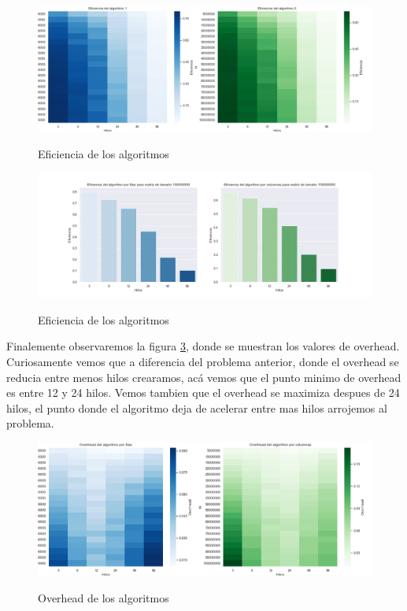 \documentclass{report}
\begin{document}
\begin{figure}[H]
    \centering
  \caption{Eficiencia de los algoritmos}
  \includegraphics[width=\textwidth]{square-eff}
\label{fig:squareeff}
\end{figure}

\begin{figure}[H]
    \centering
  \caption{Eficiencia de los algoritmos}
  \includegraphics[width=\textwidth]{square-eff-bar}
\label{fig:squareeffbar}
\end{figure}

Finalemente observaremos la figura \ref{fig:squareoverhead}, donde se muestran los
valores de overhead. Curiosamente vemos que a diferencia del problema anterior, donde
el overhead se reducia entre menos hilos crearamos, acá vemos que el punto minimo de
overhead es entre 12 y 24 hilos. Vemos tambien que el overhead se maximiza despues de
24 hilos, el punto donde el algoritmo deja de acelerar entre mas hilos arrojemos al
problema.

\begin{figure}[H]
    \centering
  \caption{Overhead de los algoritmos}
  \includegraphics[width=\textwidth]{square-overhead}
\label{fig:squareoverhead}
\end{figure}
\end{document}
